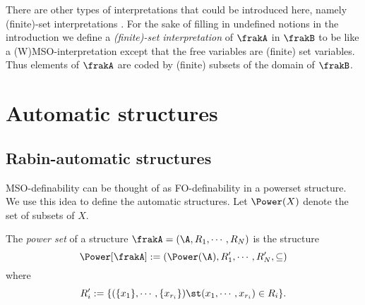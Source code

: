 There are other types of interpretations that could be introduced here, namely
(finite)-set interpretations \cite{ElRa66} \cite{CoLo07}.  For the sake
of filling in undefined notions in the introduction we define a {\em (finite)-set
interpretation} of $\frakA$ in $\frakB$ to be like a (W)MSO-interpretation except
that the free variables are (finite) set
variables. Thus elements of $\frakA$ are coded by (finite) subsets of the domain
of $\frakB$.

\iffalse
?? ALT DFN ??

\begin{definition}
\begin{enumerate}
\item A structure FO-interpretable in $\Power_f(\frakT_1)$ is called {\em finite-string automatic}.
\item A structure FO-interpretable in $\Power(\frakT_1)$ is called {\em $\omega$-string automatic}.
\item A structure FO-interpretable in $\Power_f(\frakT_2)$ is called {\em finite-tree automatic}.
\item A structure FO-interpretable in $\Power(\frakT_2)$ is called {\em $\omega$-tree automatic}.
\end{enumerate}
\end{definition}
\fi
\section{Automatic structures} \label{AS:sec:autstr}

\subsection{Rabin-automatic structures}

MSO-definability can be thought of as FO-definability in a powerset structure. We use this idea to define the automatic structures.
Let $\Power(X)$ denote the set of subsets of $X$. 

\begin{definition} \label{AS:dfn:powerset} \cite{CoLo07}
The {\em power set} of a structure $\frakA = ({\A},R_1,\cdots,R_N)$ is the structure
\[
\Power[\frakA] := (\Power({\A}),{R'_1}, \cdots,{R'_N}, \subseteq)
\]
where 
\[
 R'_i := \{ (\{x_1\},\cdots,\{x_{r_i}\}) \st (x_1,\cdots,x_{r_i}) \in R_i\}. 
\]
\end{definition}

